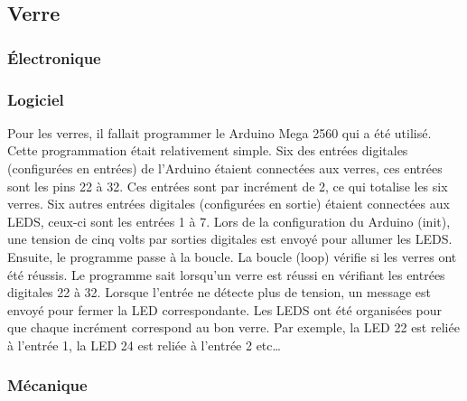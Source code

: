 
\subsection{Verre}

\subsubsection{Électronique}


\subsubsection{Logiciel}



Pour les verres, il fallait programmer le Arduino Mega 2560 qui a été utilisé.
Cette programmation était relativement simple.
Six des entrées digitales (configurées en entrées) de l'Arduino étaient connectées aux verres, ces entrées sont les pins 22 à 32.
Ces entrées sont par incrément de 2, ce qui totalise les six verres.
Six autres entrées digitales (configurées en sortie) étaient connectées aux LEDS, ceux-ci sont les entrées 1 à 7.
Lors de la configuration du Arduino (init), une tension de cinq volts par sorties digitales est envoyé pour allumer les LEDS.
Ensuite, le programme passe à la boucle.
La boucle (loop) vérifie si les verres ont été réussis.
Le programme sait lorsqu'un verre est réussi en vérifiant les entrées digitales 22 à 32.
Lorsque l'entrée ne détecte plus de tension, un message est envoyé pour fermer la LED correspondante.
Les LEDS ont été organisées pour que chaque incrément correspond au bon verre.
Par exemple, la LED 22 est reliée à l’entrée 1, la LED 24 est reliée à l’entrée 2 etc…

\subsubsection{Mécanique}


